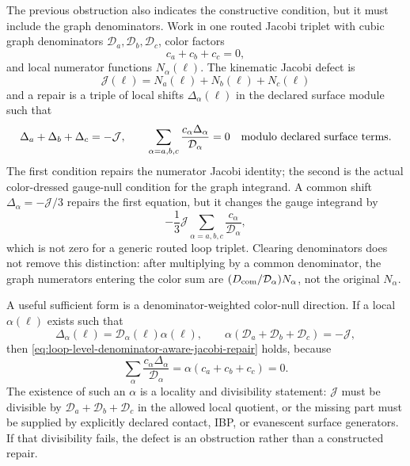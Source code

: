 \begin{controlledapproximation}
\label{ca:loop-level-jacobi-repair-double-copy-null}
The previous obstruction also indicates the constructive condition, but it
must include the graph denominators.  Work in one routed Jacobi triplet with
cubic graph denominators \(\mathcal D_a,\mathcal D_b,\mathcal D_c\), color factors
\[
  c_a+c_b+c_c=0,
\]
and local numerator functions \(N_\alpha(\ell)\).  The kinematic Jacobi
defect is
\begin{equation}
  \mathcal J(\ell)=N_a(\ell)+N_b(\ell)+N_c(\ell)
  \label{eq:loop-level-jacobi-defect-to-repair}
\end{equation}
and a repair is a triple of local shifts \(\Delta_\alpha(\ell)\) in the
declared surface module such that
\begin{equation}
  \Delta_a+\Delta_b+\Delta_c=-\mathcal J,
  \qquad
  \sum_{\alpha=a,b,c}
  \frac{c_\alpha\Delta_\alpha}{\mathcal D_\alpha}=0
  \quad
  \hbox{modulo declared surface terms}.
  \label{eq:loop-level-denominator-aware-jacobi-repair}
\end{equation}
The first condition repairs the numerator Jacobi identity; the second is the
actual color-dressed gauge-null condition for the graph integrand.  A common
shift \(\Delta_\alpha=-\mathcal J/3\) repairs the first equation, but it
changes the gauge integrand by
\[
  -\frac13\mathcal J
  \sum_{\alpha=a,b,c}\frac{c_\alpha}{\mathcal D_\alpha},
\]
which is not zero for a generic routed loop triplet.  Clearing denominators
does not remove this distinction: after multiplying by a common denominator,
the graph numerators entering the color sum are
\((D_{\rm com}/\mathcal D_\alpha)N_\alpha\), not the original
\(N_\alpha\).

A useful sufficient form is a denominator-weighted color-null direction.  If a
local \(\alpha(\ell)\) exists such that
\begin{equation}
  \Delta_\alpha(\ell)=\mathcal D_\alpha(\ell)\alpha(\ell),
  \qquad
  \alpha(\mathcal D_a+\mathcal D_b+\mathcal D_c)=-\mathcal J,
  \label{eq:loop-level-denominator-weighted-repair}
\end{equation}
then \eqref{eq:loop-level-denominator-aware-jacobi-repair} holds, because
\[
  \sum_\alpha\frac{c_\alpha\Delta_\alpha}{\mathcal D_\alpha}
  =
  \alpha(c_a+c_b+c_c)=0 .
\]
The existence of such an \(\alpha\) is a locality and divisibility statement:
\(\mathcal J\) must be divisible by
\(\mathcal D_a+\mathcal D_b+\mathcal D_c\) in the allowed local quotient, or
the missing part must be supplied by explicitly declared contact, IBP, or
evanescent surface generators.  If that divisibility fails, the defect is an
obstruction rather than a constructed repair.


\end{controlledapproximation}

